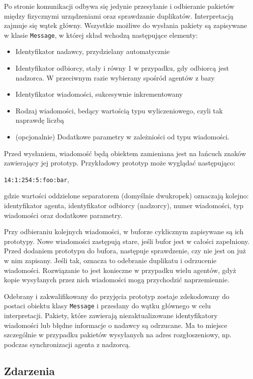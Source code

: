 Po stronie komunikacji odbywa się jedynie przesyłanie i odbieranie pakietów między fizycznymi urządzeniami oraz sprawdzanie duplikatów. Interpretacją zajmuje się wątek główny. Wszystkie możliwe do wysłania pakiety są zapisywane w klasie {\tt Message}, w której skład wchodzą następujące elementy:
\begin{itemize}
    \item Identyfikator nadawcy, przydzielany automatycznie
    \item Identyfikator odbiorcy, stały i równy 1 w przypadku, gdy odbiorcą jest nadzorca. W przeciwnym razie wybierany spośród agentów z bazy
    \item Identyfikator wiadomości, sukcesywnie inkrementowany
    \item Rodzaj wiadomości, bedący wartością typu wyliczeniowego, czyli tak naprawdę liczbą
    \item (opcjonalnie) Dodatkowe parametry w zależniości od typu wiadomości.
\end{itemize}

Przed wysłaniem, wiadomość będą obiektem zamieniana jest na łańcuch znaków zawierający jej prototyp. Przykładowy prototyp może wyglądać następująco:
\begin{center} {\tt 14:1:254:5:foo:bar},\\ \end{center}
gdzie wartości oddzielone separatorem (domyślnie dwukropek) oznaczają kolejno: identyfikator agenta, identyfikator odbiorcy (nadzorcy), numer wiadomości, typ wiadomości oraz dodatkowe parametry.

Przy odbieraniu kolejnych wiadomości, w buforze cyklicznym zapisywane są ich prototypy. Nowe wiadomości zastępują stare, jeśli bufor jest w całości zapełniony. Przed dodaniem prototypu do bufora, następuje sprawdzenie, czy nie jest on już w nim zapisany. Jeśli tak, oznacza to odebranie duplikatu i odrzucenie wiadomości. Rozwiązanie to jest konieczne w przypadku wielu agentów, gdyż kopie wysyłanych przez nich wiadomości mogą przychodzić naprzemiennie.

Odebrany i zakwalifikowany do przyjęcia prototyp zostaje zdekodowany do postaci obiektu klasy {\tt Message} i przesłany do wątku głównego w celu interpretacji. Pakiety, które zawierają niezaktualizowane identyfikatory wiadomości lub błędne informacje o nadawcy są odrzucane. Ma to miejsce szczególnie w przypadku pakietów wysyłanych na adres rozgłoszeniowy, np. podczas synchronizacji agenta z nadzorcą.

\subsection{Zdarzenia}

